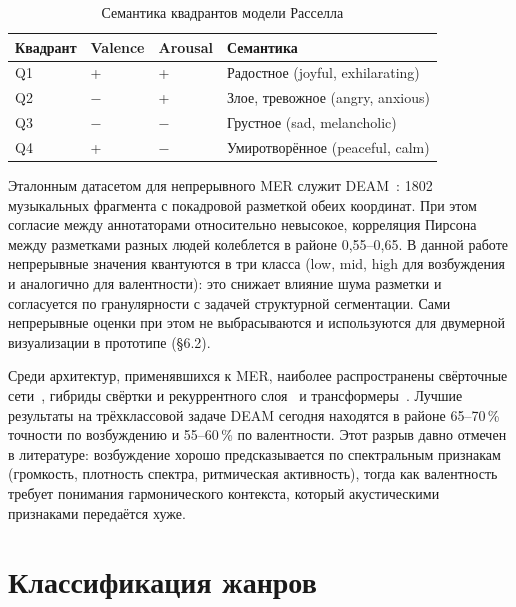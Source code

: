 \begin{table}[H]
\centering
\caption{Семантика квадрантов модели Расселла}
\label{tab:russell-quadrants}
\begin{tabular}{llll}
\toprule
Квадрант & Valence & Arousal & Семантика \\
\midrule
Q1 & + & + & Радостное (joyful, exhilarating) \\
Q2 & $-$ & + & Злое, тревожное (angry, anxious) \\
Q3 & $-$ & $-$ & Грустное (sad, melancholic) \\
Q4 & + & $-$ & Умиротворённое (peaceful, calm) \\
\bottomrule
\end{tabular}
\end{table}

Эталонным датасетом для непрерывного MER служит DEAM~\cite{aljanaki2017deam}: 1802 музыкальных фрагмента с покадровой разметкой обеих координат. При этом согласие между аннотаторами относительно невысокое, корреляция Пирсона между разметками разных людей колеблется в районе 0{,}55--0{,}65. В данной работе непрерывные значения квантуются в три класса (low, mid, high для возбуждения и аналогично для валентности): это снижает влияние шума разметки и согласуется по гранулярности с задачей структурной сегментации. Сами непрерывные оценки при этом не выбрасываются и используются для двумерной визуализации в прототипе (§6.2).

Среди архитектур, применявшихся к MER, наиболее распространены свёрточные сети~\cite{choi2017crnn}, гибриды свёртки и рекуррентного слоя~\cite{wang2017autotagging} и трансформеры~\cite{won2020selfattention}. Лучшие результаты на трёхклассовой задаче DEAM сегодня находятся в районе 65--70\,\% точности по возбуждению и 55--60\,\% по валентности. Этот разрыв давно отмечен в литературе: возбуждение хорошо предсказывается по спектральным признакам (громкость, плотность спектра, ритмическая активность), тогда как валентность требует понимания гармонического контекста, который акустическими признаками передаётся хуже.

\section{Классификация жанров}\label{sec:1-4}

